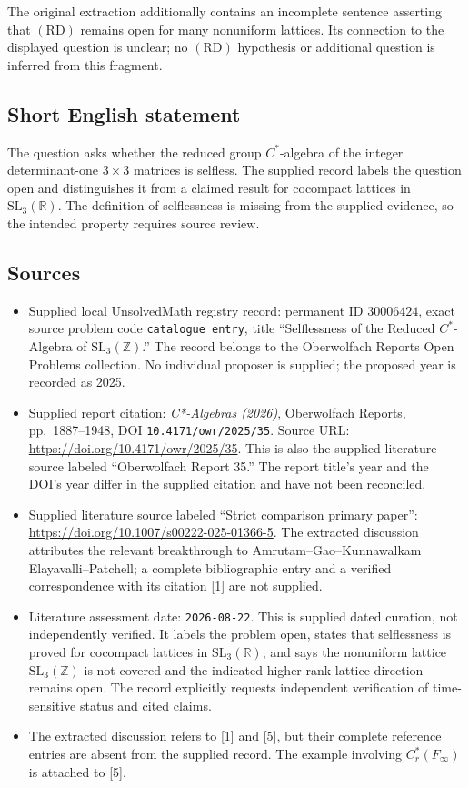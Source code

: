 \documentclass[11pt]{article}
\newcommand{\Z}{\mathbb{Z}}
\newcommand{\R}{\mathbb{R}}
\begin{document}
The original extraction additionally contains an incomplete sentence asserting that \((\mathrm{RD})\) remains open for many nonuniform lattices. Its connection to the displayed question is unclear; no \((\mathrm{RD})\) hypothesis or additional question is inferred from this fragment.
\subsection{Short English statement}
The question asks whether the reduced group \(C^*\)-algebra of the integer determinant-one \(3\times3\) matrices is selfless. The supplied record labels the question open and distinguishes it from a claimed result for cocompact lattices in \(\mathrm{SL}_3(\R)\). The definition of selflessness is missing from the supplied evidence, so the intended property requires source review.
\subsection{Sources}
\begin{itemize}
\item Supplied local UnsolvedMath registry record: permanent ID \(30006424\), exact source problem code \texttt{catalogue entry}, title ``Selflessness of the Reduced \(C^*\)-Algebra of \(\mathrm{SL}_3(\Z)\).'' The record belongs to the Oberwolfach Reports Open Problems collection. No individual proposer is supplied; the proposed year is recorded as 2025.
\item Supplied report citation: \emph{C*-Algebras (2026)}, Oberwolfach Reports, pp.\ 1887--1948, DOI \texttt{10.4171/owr/2025/35}. Source URL: \url{https://doi.org/10.4171/owr/2025/35}. This is also the supplied literature source labeled ``Oberwolfach Report 35.'' The report title's year and the DOI's year differ in the supplied citation and have not been reconciled.
\item Supplied literature source labeled ``Strict comparison primary paper'': \url{https://doi.org/10.1007/s00222-025-01366-5}. The extracted discussion attributes the relevant breakthrough to Amrutam--Gao--Kunnawalkam Elayavalli--Patchell; a complete bibliographic entry and a verified correspondence with its citation [1] are not supplied.
\item Literature assessment date: \texttt{2026-08-22}. This is supplied dated curation, not independently verified. It labels the problem open, states that selflessness is proved for cocompact lattices in \(\mathrm{SL}_3(\R)\), and says the nonuniform lattice \(\mathrm{SL}_3(\Z)\) is not covered and the indicated higher-rank lattice direction remains open. The record explicitly requests independent verification of time-sensitive status and cited claims.
\item The extracted discussion refers to [1] and [5], but their complete reference entries are absent from the supplied record. The example involving \(C_r^*(F_\infty)\) is attached to [5].
\end{itemize}
\end{document}
